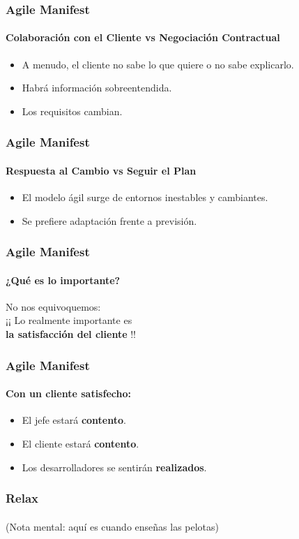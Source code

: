 \begin{frame}
  \frametitle{Agile Manifest}
  \framesubtitle{Colaboración con el Cliente vs Negociación Contractual}

  \begin{itemize}
  \item A menudo, el cliente no sabe lo que quiere o no sabe explicarlo.
  \item Habrá información sobreentendida.
  \item Los requisitos cambian.
  \end{itemize}

\end{frame}

\begin{frame}
  \frametitle{Agile Manifest}
  \framesubtitle{Respuesta al Cambio vs Seguir el Plan}

  \begin{itemize}
  \item El modelo ágil surge de entornos inestables y cambiantes.
  \item Se prefiere adaptación frente a previsión.
  \end{itemize}

\end{frame}

\begin{frame}
  \frametitle{Agile Manifest}
  \framesubtitle{¿Qué es lo importante?}

  \begin{center}
    No nos equivoquemos:\\
    ¡¡ Lo realmente importante es \\[1pc]
    \textbf{\Large la satisfacción del cliente} !!
  \end{center}
\end{frame}



\begin{frame}
  \frametitle{Agile Manifest}
  \framesubtitle{Con un cliente satisfecho:}

  \begin{itemize}
  \item El jefe estará \textbf{contento}.
  \item El cliente estará \textbf{contento}.
  \item Los desarrolladores se sentirán \textbf{realizados}.
  \end{itemize}
\end{frame}


\begin{frame}
  \frametitle{Relax}
  \framesubtitle{}

  (Nota mental: aquí es cuando enseñas las pelotas)

\end{frame}


